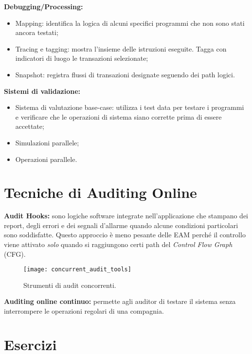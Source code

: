\textbf{Debugging/Processing:}

\begin{itemize}
    \item Mapping: identifica la logica di alcuni specifici programmi che non
    sono stati ancora testati;
    \item Tracing e tagging: mostra l'insieme delle istruzioni eseguite. Tagga
    con indicatori di luogo le
    transazioni selezionate;
    \item Snapshot: registra flussi di transazioni designate seguendo dei path
    logici.
\end{itemize}

\textbf{Sistemi di validazione:}

\begin{itemize}
    \item Sistema di valutazione base-case: utilizza i test data per testare i
    programmi e verificare che
    le operazioni di sistema siano corrette prima di essere accettate;
    \item Simulazioni parallele;
    \item Operazioni parallele.
\end{itemize}

\section{Tecniche di Auditing Online}

\textbf{Audit Hooks:} sono logiche software integrate nell'applicazione
che stampano dei report, degli errori e dei segnali d'allarme 
quando alcune condizioni particolari sono soddisfatte.
Questo approccio è meno pesante delle EAM perché il controllo 
viene attivato \emph{solo} quando si raggiungono certi path
del \textit{Control Flow Graph} (CFG).

\begin{figure}[h!]
        \begin{center}
                \texttt{[image: concurrent\_audit\_tools]}
        \end{center}
        \caption{Strumenti di audit concorrenti.}
        \label{fig:concurrent:audit:tools}
\end{figure}

\noindent \textbf{Auditing online continuo:} permette agli auditor di
testare il sistema senza interrompere le operazioni regolari di una
compagnia.

\section{Esercizi}

